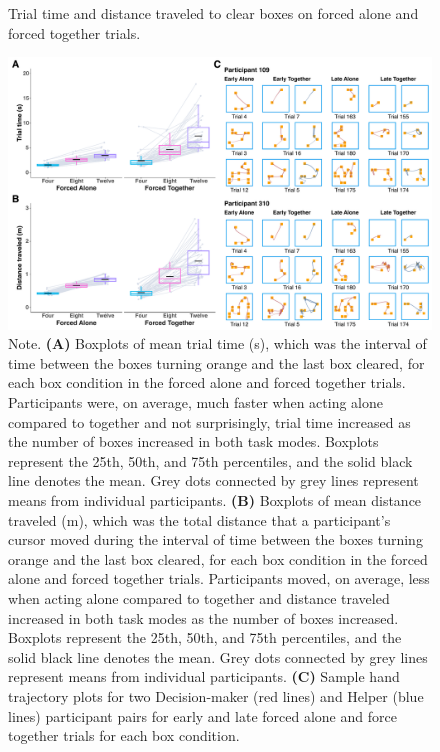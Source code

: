 \documentclass[
  man,
  floatsintext,
  longtable,
  nolmodern,
  notxfonts,
  notimes,
  colorlinks=true,linkcolor=blue,citecolor=blue,urlcolor=blue]{apa7}
\begin{document}
\begin{figure}[htbp]
\caption{Trial time and distance traveled to clear boxes on forced alone and forced together trials.}
\centering
\includegraphics[scale=0.5]{../../figs/fig3.pdf}
\setlength{\belowcaptionskip}{-2em}
\caption*{\singlespacing \small Note. \normalfont \textbf{(A)} Boxplots of mean trial time (s), which was the interval of time between the boxes turning orange and the last box cleared, for each box condition in the forced alone and forced together trials. Participants were, on average, much faster when acting alone compared to together and not surprisingly, trial time increased as the number of boxes increased in both task modes. Boxplots represent the 25th, 50th, and 75th percentiles, and the solid black line denotes the mean. Grey dots connected by grey lines represent means from individual participants. \textbf{(B)} Boxplots of mean distance traveled (m), which was the total distance that a participant's cursor moved during the interval of time between the boxes turning orange and the last box cleared, for each box condition in the forced alone and forced together trials. Participants moved, on average, less when acting alone compared to together and distance traveled increased in both task modes as the number of boxes increased. Boxplots represent the 25th, 50th, and 75th percentiles, and the solid black line denotes the mean. Grey dots connected by grey lines represent means from individual participants. \textbf{(C)} Sample hand trajectory plots for two Decision-maker (red lines) and Helper (blue lines) participant pairs for early and late forced alone and force together trials for each box condition.
}
\label{fig:fig3}
\end{figure}
\end{document}
